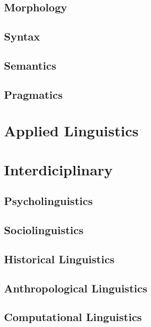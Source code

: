 \documentclass[a4paper]{article}
\begin{document}
        \subsection{Morphology}
        
        \subsection{Syntax}
        
        \subsection{Semantics}
        
        \subsection{Pragmatics}
    
    
    \section{Applied Linguistics}
    
    
    \section{Interdiciplinary}
        
        \subsection{Psycholinguistics}
        
        \subsection{Sociolinguistics}
        
        \subsection{Historical Linguistics}
        
        \subsection{Anthropological Linguistics}
        
        \subsection{Computational Linguistics}
        
\end{document}
